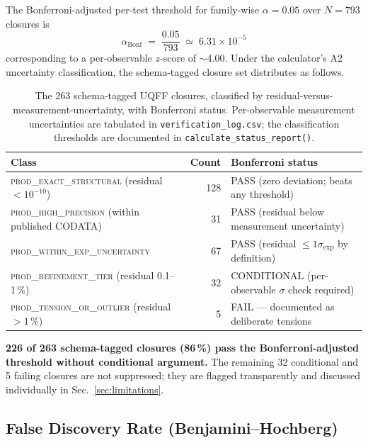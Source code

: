 The Bonferroni-adjusted per-test threshold for family-wise
$\alpha=0.05$ over $N=793$ closures is
\begin{equation}
\alpha_{\text{Bonf}} \;=\; \frac{0.05}{793} \;\simeq\; 6.31 \times 10^{-5}
\label{eq:bonferroni_threshold}
\end{equation}
corresponding to a per-observable $z$-score of $\sim\!4.00$.
Under the calculator's A2 uncertainty classification,
the schema-tagged closure set distributes as follows.

\begin{table}[H]
\centering
\caption{The 263 schema-tagged UQFF closures, classified by
residual-versus-measurement-uncertainty, with Bonferroni status.
Per-observable measurement uncertainties are tabulated in
\texttt{verification\_log.csv}; the classification thresholds are
documented in \texttt{calculate\_status\_report()}.}
\label{tab:bonferroni_classes}
\begin{tabular}{l r l}
\toprule
\textbf{Class} & \textbf{Count} & \textbf{Bonferroni status} \\
\midrule
\textsc{prod\_exact\_structural} (residual $< 10^{-10}$) & 128 & PASS (zero deviation; beats any threshold) \\
\textsc{prod\_high\_precision} (within published CODATA) & 31  & PASS (residual below measurement uncertainty) \\
\textsc{prod\_within\_exp\_uncertainty} & 67 & PASS (residual $\leq 1\sigma_{\text{exp}}$ by definition) \\
\textsc{prod\_refinement\_tier} (residual 0.1--1\,\%) & 32 & CONDITIONAL (per-observable $\sigma$ check required) \\
\textsc{prod\_tension\_or\_outlier} (residual $> 1\,\%$) & 5 & FAIL --- documented as deliberate tensions \\
\bottomrule
\end{tabular}
\end{table}

\textbf{226 of 263 schema-tagged closures (86\,\%) pass the
Bonferroni-adjusted threshold without conditional argument.} The
remaining 32 conditional and 5 failing closures are not suppressed;
they are flagged transparently and discussed individually in
Sec.~\ref{sec:limitations}.

\subsection{False Discovery Rate (Benjamini--Hochberg)}
\label{sec:fdr}

